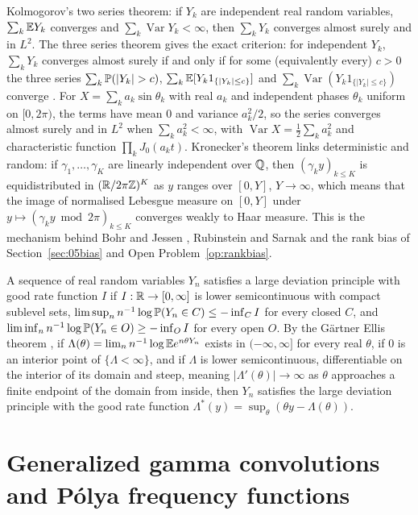 Kolmogorov's two series theorem: if $Y_k$ are independent real random variables, $\sum_k\mathbb{E} Y_k$ converges and $\sum_k\operatorname{Var}Y_k<\infty$, then $\sum_kY_k$ converges almost surely and in $L^2$. The three series theorem gives the exact criterion: for independent $Y_k$, $\sum_kY_k$ converges almost surely if and only if for some (equivalently every) $c>0$ the three series $\sum_k\Prob(|Y_k|>c)$, $\sum_k\mathbb{E}[Y_k1_{\{|Y_k|\le c\}}]$ and $\sum_k\operatorname{Var}(Y_k1_{\{|Y_k|\le c\}})$ converge \cite{billingsley1995}. For $X=\sum_ka_k\sin\theta_k$ with real $a_k$ and independent phases $\theta_k$ uniform on $[0,2\pi)$, the terms have mean $0$ and variance $a_k^2/2$, so the series converges almost surely and in $L^2$ when $\sum_ka_k^2<\infty$, with $\operatorname{Var}X=\tfrac12\sum_ka_k^2$ and characteristic function $\prod_kJ_0(a_kt)$. Kronecker's theorem links deterministic and random: if $\gamma_1,\dots,\gamma_K$ are linearly independent over $\mathbb{Q}$, then $(\gamma_ky)_{k\le K}$ is equidistributed in $(\mathbb{R}/2\pi\mathbb{Z})^K$ as $y$ ranges over $[0,Y]$, $Y\to\infty$, which means that the image of normalised Lebesgue measure on $[0,Y]$ under $y\mapsto(\gamma_ky\bmod2\pi)_{k\le K}$ converges weakly to Haar measure. This is the mechanism behind Bohr and Jessen \cite{bohrjessen1930}, Rubinstein and Sarnak \cite{rubinsteinsarnak1994} and the rank bias of Section~\ref{sec:05bias} and Open Problem~\ref{op:rankbias}.

A sequence of real random variables $Y_n$ satisfies a large deviation principle with good rate function $I$ if $I:\mathbb{R}\to[0,\infty]$ is lower semicontinuous with compact sublevel sets, $\limsup_nn^{-1}\log\mathbb{P}(Y_n\in C)\le-\inf_CI$ for every closed $C$, and $\liminf_nn^{-1}\log\mathbb{P}(Y_n\in O)\ge-\inf_OI$ for every open $O$. By the G\"artner Ellis theorem \cite[Theorem 2.3.6]{dembozeitouni1998}, if $\Lambda(\theta)=\lim_nn^{-1}\log\mathbb{E} e^{n\theta Y_n}$ exists in $(-\infty,\infty]$ for every real $\theta$, if $0$ is an interior point of $\{\Lambda<\infty\}$, and if $\Lambda$ is lower semicontinuous, differentiable on the interior of its domain and steep, meaning $|\Lambda'(\theta)|\to\infty$ as $\theta$ approaches a finite endpoint of the domain from inside, then $Y_n$ satisfies the large deviation principle with the good rate function $\Lambda^*(y)=\sup_\theta(\theta y-\Lambda(\theta))$.

\section{Generalized gamma convolutions and P\'olya frequency functions}

